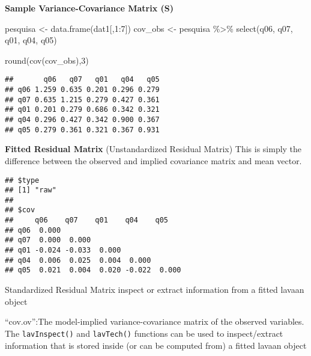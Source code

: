 \documentclass[
]{article}
\newenvironment{Shaded}{\begin{snugshade}}{\end{snugshade}}
\newcommand{\DecValTok}[1]{\textcolor[rgb]{0.00,0.00,0.81}{#1}}
\newcommand{\FunctionTok}[1]{\textcolor[rgb]{0.00,0.00,0.00}{#1}}
\newcommand{\NormalTok}[1]{#1}
\newcommand{\OtherTok}[1]{\textcolor[rgb]{0.56,0.35,0.01}{#1}}
\newcommand{\SpecialCharTok}[1]{\textcolor[rgb]{0.00,0.00,0.00}{#1}}
\begin{document}
\textbf{Sample Variance-Covariance Matrix (S)}

\begin{Shaded}
\begin{Highlighting}[]
\NormalTok{pesquisa }\OtherTok{\textless{}{-}} \FunctionTok{data.frame}\NormalTok{(dat1[,}\DecValTok{1}\SpecialCharTok{:}\DecValTok{7}\NormalTok{])}
\NormalTok{cov\_obs }\OtherTok{\textless{}{-}}\NormalTok{ pesquisa }\SpecialCharTok{\%\textgreater{}\%} 
  \FunctionTok{select}\NormalTok{(q06, q07, q01, q04, q05) }

  \FunctionTok{round}\NormalTok{(}\FunctionTok{cov}\NormalTok{(cov\_obs),}\DecValTok{3}\NormalTok{)}
\end{Highlighting}
\end{Shaded}

\begin{verbatim}
##       q06   q07   q01   q04   q05
## q06 1.259 0.635 0.201 0.296 0.279
## q07 0.635 1.215 0.279 0.427 0.361
## q01 0.201 0.279 0.686 0.342 0.321
## q04 0.296 0.427 0.342 0.900 0.367
## q05 0.279 0.361 0.321 0.367 0.931
\end{verbatim}

\textbf{Fitted Residual Matrix} (Unstandardized Residual Matrix) This is
simply the difference between the observed and implied covariance matrix
and mean vector.

\begin{Shaded}
\end{Shaded}

\begin{verbatim}
## $type
## [1] "raw"
## 
## $cov
##     q06    q07    q01    q04    q05   
## q06  0.000                            
## q07  0.000  0.000                     
## q01 -0.024 -0.033  0.000              
## q04  0.006  0.025  0.004  0.000       
## q05  0.021  0.004  0.020 -0.022  0.000
\end{verbatim}

Standardized Residual Matrix inspect or extract information from a
fitted lavaan object

``cov.ov'':The model-implied variance-covariance matrix of the observed
variables. The \texttt{lavInspect()} and \texttt{lavTech()} functions
can be used to inspect/extract information that is stored inside (or can
be computed from) a fitted lavaan object
\end{document}
